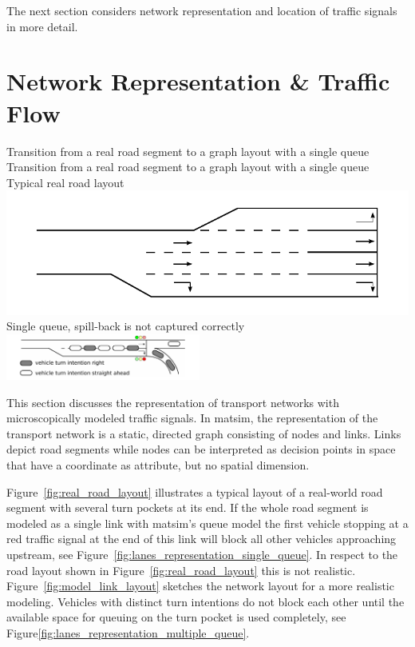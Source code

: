 The next section considers network representation and location of traffic signals in more detail. 

\section{Network Representation \& Traffic Flow}
\label{sec:signals_network_traffic_flow}

\createfigure%
{Transition from a real road segment to a graph layout with a single queue}%
{Transition from a real road segment to a graph layout with a single queue}
{\label{fig:combined_model}}
{%
  \createsubfigure%
	{Typical real road layout}
	{\includegraphics[width=0.475\linewidth]{extending/figures/signalslanes/real_road_layout.pdf}}
	{\label{fig:real_road_layout}}
  \createsubfigure%
	{Single queue, spill-back is not captured correctly}%
	{\includegraphics[width=0.48\textwidth]{extending/figures/signalslanes/single_queue_model_inkscape.pdf}}%
	{\label{fig:lanes_representation_single_queue}}%
}%
{\citet{Grether2014PhD}}

This section discusses the representation of transport networks with microscopically modeled traffic signals. 
In \gls{matsim}, the representation of the transport network is a static, directed graph consisting of nodes and links. 
Links depict road segments while nodes can be interpreted as decision points in space that have a coordinate as attribute, but no spatial dimension. 

Figure~\ref{fig:real_road_layout} illustrates a typical layout of a real-world road segment with several turn pockets at its end. 
If the whole road segment is modeled as a single link with \gls{matsim}'s queue model the first vehicle stopping at a red traffic signal at the end of this link will block all other vehicles approaching upstream, see Figure~\ref{fig:lanes_representation_single_queue}. 
In respect to the road layout shown in Figure~\ref{fig:real_road_layout} this is not realistic. 
Figure~\ref{fig:model_link_layout} sketches the network layout for a more realistic modeling. 
Vehicles with distinct turn intentions do not block each other until the available space for queuing on the turn pocket is used completely, see Figure\ref{fig:lanes_representation_multiple_queue}. 

